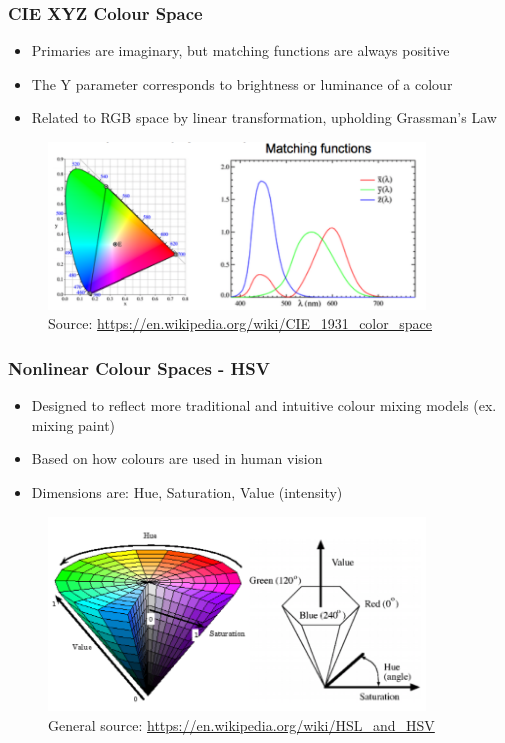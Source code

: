 \documentclass[letterpaper,12pt]{article}
\begin{document}
\subsubsection{CIE XYZ Colour Space}
\begin{itemize}
 \item Primaries are imaginary, but matching functions are always positive
 \item The Y parameter corresponds to brightness or luminance of a colour
 \item Related to RGB space by linear transformation, upholding Grassman's Law
\end{itemize}
\begin{figure}[h!]
 \centering
 \includegraphics[width=10cm]{images/ciexyz.png}
 \caption{Source: \url{https://en.wikipedia.org/wiki/CIE_1931_color_space}}
\end{figure}


\subsubsection{Nonlinear Colour Spaces - HSV}
\begin{itemize}
 \item Designed to reflect more traditional and intuitive colour mixing models (ex. mixing paint)
 \item Based on how colours are used in human vision
 \item Dimensions are: Hue, Saturation, Value (intensity)
\end{itemize}
\begin{figure}[h!]
 \centering
 \includegraphics[width=10cm]{images/hsv.png}
 \caption{General source: \url{https://en.wikipedia.org/wiki/HSL_and_HSV}}
\end{figure}
\end{document}
